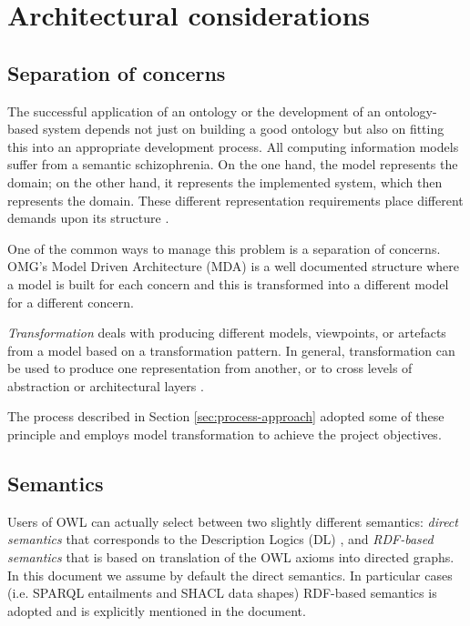 \section{Architectural considerations}
\label{sec:architecture}

	\subsection{Separation of concerns}
	\label{sec:separation-conceprns}
	
	The successful application of an ontology or the development of an ontology-based system depends not just on building a good ontology but also on fitting this into an appropriate development  process.  All computing information models suffer from a semantic schizophrenia. On the one hand, the model represents the domain; on the other hand, it represents the implemented system, which then represents the domain. These different representation requirements place different demands upon its structure \cite{partridge2013}.
	
	One of the common ways to manage this problem is a separation of concerns. OMG's Model Driven Architecture (MDA) \cite{mda-paper} is a well documented structure where a model is built for each concern and this is transformed into a different model for a different concern. 
	
	\textit{Transformation} deals with producing different models, viewpoints, or artefacts from a model based on a transformation pattern. In general, transformation can be used to produce one representation from another, or to cross levels of abstraction or architectural layers \cite{mda-guide2}. 
	
	The process described in Section \ref{sec:process-approach} adopted some of these principle and employs model transformation to achieve the project objectives.

	\subsection{Semantics}
	\label{sec:semantics}
	
	Users of OWL \citep{owl2} can actually select between two slightly different semantics: \textit{direct semantics} that corresponds to the Description Logics (DL) \cite{dl-baader2004description}, and \textit{RDF-based semantics} that is based on translation of the OWL axioms into directed graphs. In this document we assume by default the direct semantics. In particular cases (i.e. SPARQL entailments and SHACL data shapes) RDF-based semantics is adopted and is explicitly mentioned in the document. 
	
